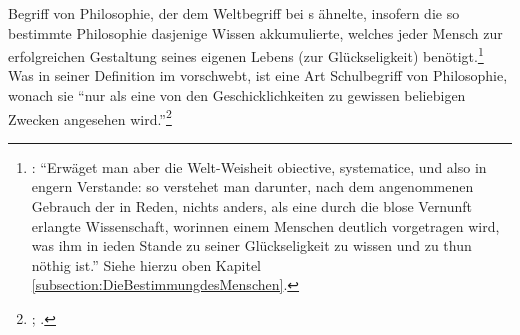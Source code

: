 \begin{nummerierung}
Begriff von Philosophie, der dem Weltbegriff bei s ähnelte,
insofern die so bestimmte Philosophie dasjenige Wissen akkumulierte, welches
jeder Mensch zur erfolgreichen Gestaltung seines eigenen Lebens (zur
Glückseligkeit)
benötigt.\footnote{\cite[Vgl.][\S~44]{Stiebritz:ErlaeuterungenderVernuenftigenGedanckenvondenKraefftendesmenschlichenVerstandesWolffs1977}:
\enquote{Erwäget man aber die Welt-Weisheit obiective, systematice, und also in
engern Verstande: so verstehet man darunter, nach dem angenommenen Gebrauch der
in Reden, nichts anders, als eine durch die blose Vernunft erlangte
Wissenschaft, worinnen einem Menschen deutlich vorgetragen wird, was ihm in
ieden Stande zu seiner Glückseligkeit zu wissen und zu thun nöthig ist.} Siehe
hierzu oben Kapitel \ref{subsection:DieBestimmungdesMenschen}.}
Was  in seiner
Definition im  vorschwebt, ist eine Art
Schulbegriff von Philosophie, wonach sie \enquote{nur als eine von den
Geschicklichkeiten zu gewissen beliebigen Zwecken angesehen
wird.}\footnote{\cite[][B 867]{Kant:KritikderreinenVernunft2003}; \cite[][III:
543.33--34]{Kant:GesammelteWerke1900ff.}.}


\end{nummerierung}
